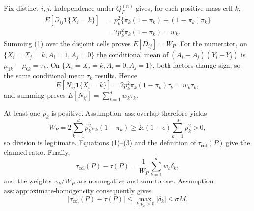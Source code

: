 Fix distinct \(i,j\).  Independence under \(Q_P^{(n)}\) gives, for each positive-mass cell \(k\),
\[
 \begin{aligned}
 E[D_{ij}\mathbf 1\{X_i=k\}]
 &=p_k^2\{\pi_k(1-\pi_k)+(1-\pi_k)\pi_k\}\\
 &=2p_k^2\pi_k(1-\pi_k)=w_k.
 \end{aligned}
\tag{1}
\]
Summing (1) over the disjoint cells proves \(E[D_{ij}]=W_P\).  For the numerator, on \(\{X_i=X_j=k,A_i=1,A_j=0\}\) the conditional mean of \((A_i-A_j)(Y_i-Y_j)\) is \(\mu_{1k}-\mu_{0k}=\tau_k\).  On \(\{X_i=X_j=k,A_i=0,A_j=1\}\), both factors change sign, so the same conditional mean \(\tau_k\) results.  Hence
\[
 E[N_{ij}\mathbf 1\{X_i=k\}]
 =2p_k^2\pi_k(1-\pi_k)\tau_k=w_k\tau_k,
\tag{2}
\]
and summing proves \(E[N_{ij}]=\sum_{k=1}^d w_k\tau_k\).

At least one \(p_k\) is positive.  Assumption~\(\mathrm{ass:overlap}\) therefore yields
\[
 W_P=2\sum_{k=1}^d p_k^2\pi_k(1-\pi_k)
 \ge 2\epsilon(1-\epsilon)\sum_{k=1}^d p_k^2>0,
\tag{3}
\]
so division is legitimate.  Equations (1)--(3) and the definition of \(\tau_{\mathrm{col}}(P)\) give the claimed ratio.  Finally,
\[
 \tau_{\mathrm{col}}(P)-\tau(P)
 =\frac{1}{W_P}\sum_{k=1}^d w_k\delta_k,
\]
and the weights \(w_k/W_P\) are nonnegative and sum to one.  Assumption~\(\mathrm{ass:approximate\text{-}homogeneity}\) consequently gives
\[
 |\tau_{\mathrm{col}}(P)-\tau(P)|
 \le \max_{k:p_k>0}|\delta_k|
 \le \sigma M.
\]
